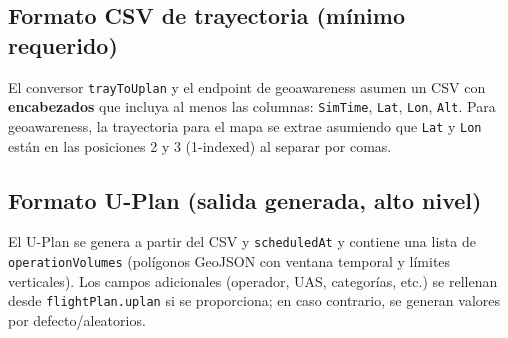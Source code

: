 \documentclass[12pt,a4paper]{article}
\begin{document}
\subsection*{Formato CSV de trayectoria (mínimo requerido)}
El conversor \texttt{trayToUplan} y el endpoint de geoawareness asumen un CSV con \textbf{encabezados} que incluya al menos las columnas: \texttt{SimTime}, \texttt{Lat}, \texttt{Lon}, \texttt{Alt}. Para geoawareness, la trayectoria para el mapa se extrae asumiendo que \texttt{Lat} y \texttt{Lon} están en las posiciones 2 y 3 (1-indexed) al separar por comas.

\subsection*{Formato U-Plan (salida generada, alto nivel)}
El U-Plan se genera a partir del CSV y \texttt{scheduledAt} y contiene una lista de \texttt{operationVolumes} (polígonos GeoJSON con ventana temporal y límites verticales). Los campos adicionales (operador, UAS, categorías, etc.) se rellenan desde \texttt{flightPlan.uplan} si se proporciona; en caso contrario, se generan valores por defecto/aleatorios.
\end{document}

